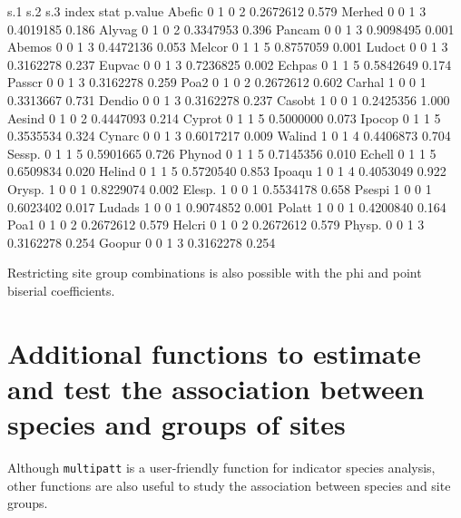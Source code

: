 \documentclass[11pt,a4paper]{article}
\begin{document}
\begin{Schunk}
\begin{Soutput}
       s.1 s.2 s.3 index      stat p.value
Abefic   0   1   0     2 0.2672612   0.579
Merhed   0   0   1     3 0.4019185   0.186
Alyvag   0   1   0     2 0.3347953   0.396
Pancam   0   0   1     3 0.9098495   0.001
Abemos   0   0   1     3 0.4472136   0.053
Melcor   0   1   1     5 0.8757059   0.001
Ludoct   0   0   1     3 0.3162278   0.237
Eupvac   0   0   1     3 0.7236825   0.002
Echpas   0   1   1     5 0.5842649   0.174
Passcr   0   0   1     3 0.3162278   0.259
Poa2     0   1   0     2 0.2672612   0.602
Carhal   1   0   0     1 0.3313667   0.731
Dendio   0   0   1     3 0.3162278   0.237
Casobt   1   0   0     1 0.2425356   1.000
Aesind   0   1   0     2 0.4447093   0.214
Cyprot   0   1   1     5 0.5000000   0.073
Ipocop   0   1   1     5 0.3535534   0.324
Cynarc   0   0   1     3 0.6017217   0.009
Walind   1   0   1     4 0.4406873   0.704
Sessp.   0   1   1     5 0.5901665   0.726
Phynod   0   1   1     5 0.7145356   0.010
Echell   0   1   1     5 0.6509834   0.020
Helind   0   1   1     5 0.5720540   0.853
Ipoaqu   1   0   1     4 0.4053049   0.922
Orysp.   1   0   0     1 0.8229074   0.002
Elesp.   1   0   0     1 0.5534178   0.658
Psespi   1   0   0     1 0.6023402   0.017
Ludads   1   0   0     1 0.9074852   0.001
Polatt   1   0   0     1 0.4200840   0.164
Poa1     0   1   0     2 0.2672612   0.579
Helcri   0   1   0     2 0.2672612   0.579
Physp.   0   0   1     3 0.3162278   0.254
Goopur   0   0   1     3 0.3162278   0.254
\end{Soutput}
\end{Schunk}
Restricting site group combinations is also possible with the phi and point biserial coefficients. 

\section{Additional functions to estimate and test the association between species and groups of sites}
Although \texttt{multipatt} is a user-friendly function for indicator species analysis, other functions are also useful to study the association between species and site groups. 
\end{document}
